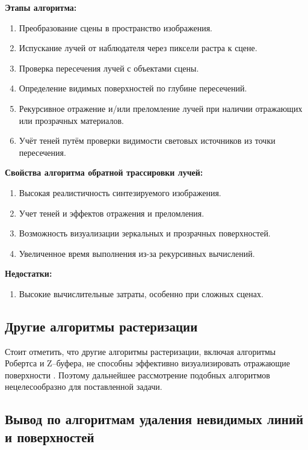 \textbf{Этапы алгоритма:}
\begin{enumerate}[label=\arabic*)]
	\item Преобразование сцены в пространство изображения.
	\item Испускание лучей от наблюдателя через пиксели растра к сцене.
	\item Проверка пересечения лучей с объектами сцены.
	\item Определение видимых поверхностей по глубине пересечений.
	\item Рекурсивное отражение и/или преломление лучей при наличии отражающих или прозрачных материалов.
	\item Учёт теней путём проверки видимости световых источников из точки пересечения.
\end{enumerate}

\textbf{Свойства алгоритма обратной трассировки лучей:}
\begin{enumerate}[label=\arabic*)]
	\item Высокая реалистичность синтезируемого изображения.
	\item Учет теней и эффектов отражения и преломления.
	\item Возможность визуализации зеркальных и прозрачных поверхностей.
	\item Увеличенное время выполнения из-за рекурсивных вычислений.
\end{enumerate}

\textbf{Недостатки:}
\begin{enumerate}[label=\arabic*)]
	\item Высокие вычислительные затраты, особенно при сложных сценах.
\end{enumerate}

\subsection{Другие алгоритмы растеризации}

Стоит отметить, что другие алгоритмы растеризации, включая алгоритмы Робертса и Z--буфера, не способны эффективно визуализировать отражающие поверхности \cite{rodgers}. Поэтому дальнейшее рассмотрение подобных алгоритмов нецелесообразно для поставленной задачи.

\subsection{Вывод по алгоритмам удаления невидимых линий и поверхностей}

